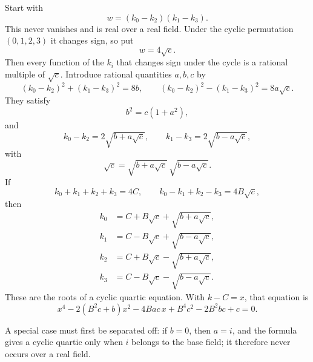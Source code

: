 \documentclass[11pt]{article}
\begin{document}
Start with
\begin{equation}
  w=(k_0-k_2)(k_1-k_3).
\end{equation}
This never vanishes and is real over a real field. Under the cyclic permutation $(0,1,2,3)$ it changes sign, so put
\begin{equation}
  w=4\sqrt c.
\end{equation}
Then every function of the $k_i$ that changes sign under the cycle is a rational multiple of $\sqrt c$. Introduce rational quantities $a,b,c$ by
\begin{equation}
  (k_0-k_2)^2+(k_1-k_3)^2=8b,
  \qquad
  (k_0-k_2)^2-(k_1-k_3)^2=8a\sqrt c.
\end{equation}
They satisfy
\begin{equation}
  b^2=c(1+a^2),
\end{equation}
and
\begin{equation}
  k_0-k_2=2\sqrt{b+a\sqrt c},
  \qquad
  k_1-k_3=2\sqrt{b-a\sqrt c},
\end{equation}
with
\begin{equation}
  \sqrt c=\sqrt{b+a\sqrt c}\,\sqrt{b-a\sqrt c}.
\end{equation}
If
\begin{equation}
  k_0+k_1+k_2+k_3=4C,
  \qquad
  k_0-k_1+k_2-k_3=4B\sqrt c,
\end{equation}
then
\begin{equation}
\begin{aligned}
 k_0&=C+B\sqrt c+\sqrt{b+a\sqrt c},\\
 k_1&=C-B\sqrt c+\sqrt{b-a\sqrt c},\\
 k_2&=C+B\sqrt c-\sqrt{b+a\sqrt c},\\
 k_3&=C-B\sqrt c-\sqrt{b-a\sqrt c}.
\end{aligned}
\end{equation}
These are the roots of a cyclic quartic equation. With $k-C=x$, that equation is
\begin{equation}
  x^4-2(B^2c+b)x^2-4Bac\,x+B^4c^2-2B^2bc+c=0.
\end{equation}

A special case must first be separated off: if $b=0$, then $a=i$, and the formula gives a cyclic quartic only when $i$ belongs to the base field; it therefore never occurs over a real field.
\end{document}

